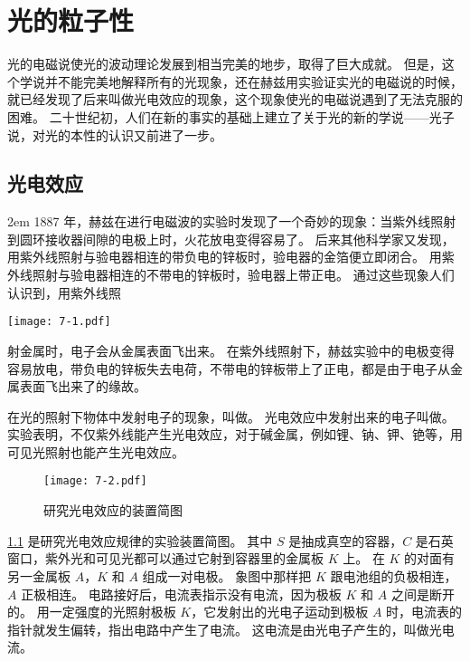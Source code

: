 \chapter{光的粒子性}\label{chp:particle_light}
光的电磁说使光的波动理论发展到相当完美的地步，取得了巨大成就。
但是，这个学说并不能完美地解释所有的光现象，还在赫兹用实验证实光的电磁说的时候，就已经发现了后来叫做光电效应的现象，这个现象使光的电磁说遇到了无法克服的困难。
二十世纪初，人们在新的事实的基础上建立了关于光的新的学说——光子说，对光的本性的认识又前进了一步。

\section{光电效应}
\par\medskip\noindent
\begin{minipage}{0.52\linewidth}\parindent2em
1887 年，赫兹在进行电磁波的实验时发现了一个奇妙的现象：当紫外线照射到圆环接收器间隙的电极上时，火花放电变得容易了。
后来其他科学家又发现，用紫外线照射与验电器相连的带负电的锌板时，验电器的金箔便立即闭合。
用紫外线照射与验电器相连的不带电的锌板时，验电器上带正电。
通过这些现象人们认识到，用紫外线照
\end{minipage}\hfill
\begin{minipage}{0.45\linewidth}
\begin{figurehere}
  \texttt{[image: 7-1.pdf]}
  \caption{紫外线照射锌板使验电器带正电}\label{fig:7-1}
\end{figurehere}
\end{minipage}
\par\vskip6pt\noindent
射金属时，电子会从金属表面飞出来。
在紫外线照射下，赫兹实验中的电极变得容易放电，带负电的锌板失去电荷，不带电的锌板带上了正电，都是由于电子从金属表面飞出来了的缘故。

在光的照射下物体中发射电子的现象，叫做。
光电效应中发射出来的电子叫做。
实验表明，不仅紫外线能产生光电效应，对于碱金属，例如锂、钠、钾、铯等，用可见光照射也能产生光电效应。
\begin{figure}
  \texttt{[image: 7-2.pdf]}
  \caption{研究光电效应的装置简图}\label{fig:7-2}
\end{figure}

\cref{fig:7-2} 是研究光电效应规律的实验装置简图。
其中 $S$ 是抽成真空的容器，$C$ 是石英窗口，紫外光和可见光都可以通过它射到容器里的金属板 $K$ 上。
在 $K$ 的对面有另一金属板 $A$，$K$ 和 $A$ 组成一对电极。
象图中那样把 $K$ 跟电池组的负极相连，$A$ 正极相连。
电路接好后，电流表指示没有电流，因为极板 $K$ 和 $A$ 之间是断开的。
用一定强度的光照射极板 $K$，它发射出的光电子运动到极板 $A$ 时，电流表的指针就发生偏转，指出电路中产生了电流。
这电流是由光电子产生的，叫做光电流。

